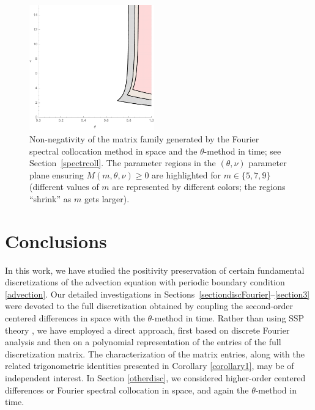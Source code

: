 \documentclass[a4paper]{article}
\newcommand{\te}{\theta}
\begin{document}
\begin{figure}
\begin{center}
\includegraphics[width=0.48\textwidth]{fig_spectral.pdf}
\caption{Non-negativity of the matrix family generated by the Fourier spectral collocation method in space and the $\theta$-method in time; see Section~\ref{spectrcoll}. The parameter regions in the $(\te,\nu)$ parameter plane ensuring $M(m,\te,\nu)\ge 0$ are highlighted for $m\in\{5, 7, 9\}$ (different values of $m$ are represented by different colors; the regions ``shrink'' as $m$ gets larger).}\label{fig_spectral}
\end{center}
\end{figure}


\section{Conclusions}\label{conclusions}

In this work, we have studied the positivity preservation of certain fundamental
discretizations of the advection equation with periodic boundary condition \eqref{advection}. 
Our detailed investigations in Sections~\ref{sectiondiscFourier}--\ref{section3}
were devoted to the  full discretization obtained by coupling the second-order centered
differences in space with the $\theta$-method in time.  
 Rather than using SSP theory \cite{SSPbook}, 
we have employed a direct
approach, first based on discrete Fourier analysis and then
on a polynomial representation of the entries of the full discretization matrix.
The characterization of the %
matrix entries, %
along with the related trigonometric identities
presented in Corollary \ref{corollary1}, may be of independent interest.
In Section \ref{otherdisc}, we considered higher-order centered
differences or Fourier spectral collocation in space, and again the $\theta$-method in time. 
\end{document}
